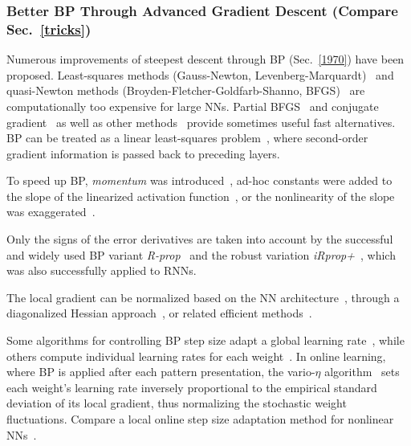 \documentclass[letterpaper]{article}
\begin{document}
\begin{CJK*}{UTF8}{gbsn}


\subsubsection{Better BP Through Advanced Gradient Descent (Compare Sec.~\ref{tricks})}
\label{betterbp}

Numerous improvements of steepest descent through BP (Sec.~\ref{1970}) have been proposed.
Least-squares methods (Gauss-Newton, Levenberg-Marquardt)~\citep{gauss1809,newton1687,levenberg1944,marquardt1963,schaback1992}
and quasi-Newton methods (Broyden-Fletcher-Goldfarb-Shanno, 
BFGS)~\citep{broyden1965,fletcher1963,goldfarb1970,shanno1970}
are computationally too expensive for large NNs.
Partial BFGS~\citep{Battiti:92,Saito:1997} and
conjugate gradient~\citep{HestenesStiefel:1952,Moller:93} 
as well as other methods~\citep{Solla:88,Schmidhuber:89-1,Cauwenberghs:93}
provide sometimes useful fast alternatives.
BP can be treated 
as a linear least-squares problem~\citep{Biegler:93}, where
second-order gradient information is passed back to preceding layers.

To speed up BP, {\em momentum} was introduced~\citep{Rumelhart:86},
ad-hoc constants were added to the slope of the linearized activation
function~\citep{Fahlman:88}, or the
nonlinearity of the slope was exaggerated~\citep{westsaad:96}.

Only the signs of the error derivatives are taken into account by the successful 
and widely used BP variant {\em R-prop}~\citep{rprop93}
and the robust variation {\em iRprop+}~\citep{igel:01},
which was also successfully applied to RNNs.

The local gradient can be normalized based 
on the NN architecture~\citep{Schraudolph:96}, 
through a diagonalized Hessian approach~\citep{Becker:89},
or related efficient methods~\citep{schraudolph02}.


Some algorithms for controlling BP step size
adapt a global learning rate~\citep{Lapedes:86a,Vogl:88,Battiti:89,lecun-simard-pearlmutter-93,Yu:1995},
while others compute individual learning rates for each
weight~\citep{Jacobs:88,SilvaAlmeida:1990}.
In online learning, where BP is applied after each pattern presentation,
the vario-$\eta$ algorithm~\citep{DBLP:conf/nips/NeuneierZ96} sets each weight's learning rate inversely proportional to the empirical standard deviation of its
local gradient, thus normalizing the stochastic weight fluctuations.
Compare a local online step size adaptation method for nonlinear NNs~\citep{Almeida:97}.


\end{CJK*}
\end{document}
